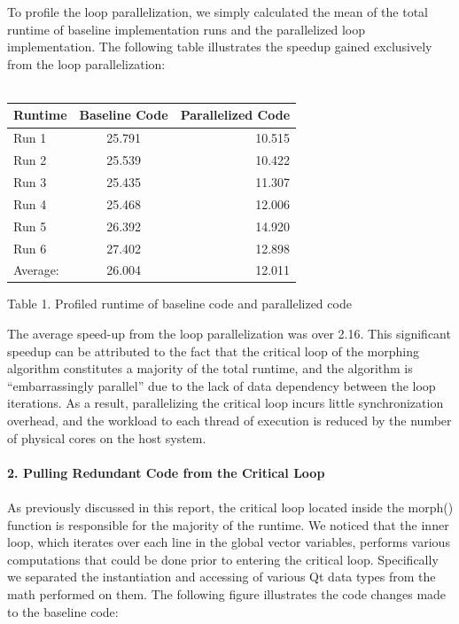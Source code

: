 \documentclass[12pt]{article}
\begin{document}
To profile the loop parallelization, we simply calculated the mean of the total runtime of baseline
implementation runs and the parallelized loop implementation. The following table illustrates the speedup
gained exclusively from the loop parallelization:\\
\\
\begin{center}
\begin{tabular}{l c r}
    Runtime & Baseline Code & Parallelized Code \\
    \hline
    Run 1 & 25.791 & 10.515\\
    Run 2 & 25.539 & 10.422\\
    Run 3 & 25.435 & 11.307\\
    Run 4 & 25.468 & 12.006\\
    Run 5 & 26.392 & 14.920\\
    Run 6 & 27.402 & 12.898\\
    \hline
    Average: & 26.004 & 12.011\\
\end{tabular}
\end{center}
\begin{center}Table 1. Profiled runtime of baseline code and parallelized code\end{center}
The average speed-up from the loop parallelization was over 2.16. This significant speedup can be attributed
to the fact that the critical loop of the morphing algorithm constitutes a majority of the total runtime, and
the algorithm is “embarrassingly parallel” due to the lack of data dependency between the loop iterations. 
As a result, parallelizing the critical loop incurs little synchronization overhead, and the workload to each
thread of execution is reduced by the number of physical cores on the host system.
\\
\\
{\bf 2. Pulling Redundant Code from the Critical Loop}
\\
\\
As previously discussed in this report, the critical loop located inside the morph() function is
responsible for the majority of the runtime. We noticed that the inner loop, which iterates over each
line in the global vector variables, performs various computations that could be done prior to
entering the critical loop. Specifically we separated the instantiation and accessing of various Qt 
data types from the math performed on them. The following figure illustrates the code changes made 
to the baseline code:
\end{document}
